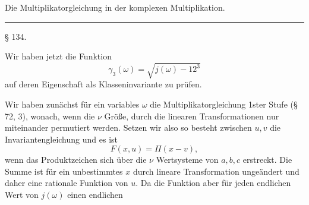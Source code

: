 
Die Multiplikatorgleichung in der komplexen
Multiplikation.

\begin{center}\rule{3cm}{0.4pt}\end{center}

§ 134. 

Wir haben jetzt die Funktion
\[
\gamma_3(\omega) = \sqrt{j(\omega) - 12^3}
\]
auf deren Eigenschaft als Klasseninvariante zu prüfen.

Wir haben zunächst für ein variables $\omega$ die Multiplikatorgleichung
 1ster Stufe (§ 72, 3), wonach, wenn
die $\nu$ Größe, %
durch die linearen Transformationen nur miteinander permutiert
werden. Setzen wir also
so besteht zwischen $u, v$ die Invariantengleichung
und es ist
\[
F(x,u) = \Pi(x-v),
\]
wenn das Produktzeichen sich über die $\nu$ Wertsysteme von
$a, b, c$ erstreckt. Die Summe
ist für ein unbestimmtes $x$ durch lineare Transformation ungeändert
 und daher eine rationale Funktion von $u$. Da die Funktion
 aber für jeden endlichen Wert von $j(\omega)$ einen endlichen
